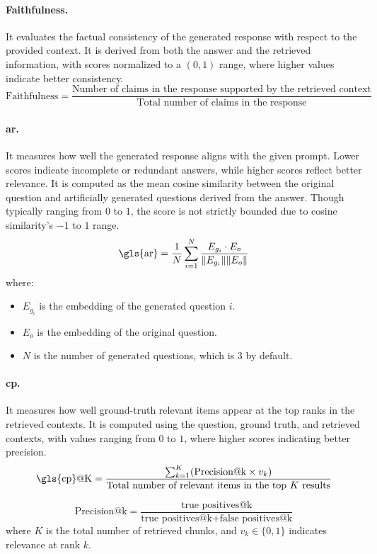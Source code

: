 \paragraph*{Faithfulness.} It evaluates the factual consistency of the generated response with respect to the provided context.
It is derived from both the answer and the retrieved information, with scores normalized to a $(0,1)$ range, where higher values indicate better consistency.
\[
\text{Faithfulness} =
\frac{\text{Number of claims in the response supported by the retrieved context}}
{\text{Total number of claims in the response}}
\]

\paragraph*{\gls{ar}.} It measures how well the generated response aligns with the given prompt.
Lower scores indicate incomplete or redundant answers, while higher scores reflect better relevance.
It is computed as the mean cosine similarity between the original question and artificially generated questions derived from the answer.
Though typically ranging from $0$ to $1$, the score is not strictly bounded due to cosine similarity's $-1$ to $1$ range.
\[
\text{\gls{ar}} =
\frac{1}{N} \sum_{i=1}^{N} \frac{E_{g_i} \cdot E_o}{\|E_{g_i}\| \|E_o\|}
\]
where:
\begin{itemize}
    \item $E_{g_i}$ is the embedding of the generated question $i$.
    \item $E_o$ is the embedding of the original question.
    \item $N$ is the number of generated questions, which is 3 by default.
\end{itemize}

\paragraph*{\gls{cp}.} It measures how well ground-truth relevant items appear at the top ranks in the retrieved contexts. It is computed using the question, ground truth, and retrieved contexts, with values ranging from $0$ to $1$, where higher scores indicating better precision.
\[
\text{\gls{cp}@K} =
\frac{\sum_{k=1}^{K} (\text{Precision@k} \times v_k)}
{\text{Total number of relevant items in the top } K \text{ results}}
\]

\[
\text{Precision@k} = 
\frac{\text{true positives@k}}{\text{true positives@k} + \text{false positives@k}}
\]
where $K$ is the total number of retrieved chunks, and  $v_k \in \{0,1\}$  indicates relevance at rank $k$.


